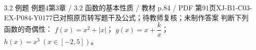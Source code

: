 \par\noindent\begin{minipage}{\linewidth}
\begin{bankitem}{3.2 例题 例题4}{第3章 / 3.2 函数的基本性质 / 教材 p.84 / PDF 第91页}{XJ-B1-C03-EX-P084-Y0177}{已对照原页转写题干及公式；待教师复核；未制作答案}
判断下列函数的奇偶性：
$f(x)=x^2+|x|$；
$g(x)=x+\dfrac kx$；
$h(x)=x^3\ (x\in[-2,5])$。
\end{bankitem}
\end{minipage}\par\medskip

